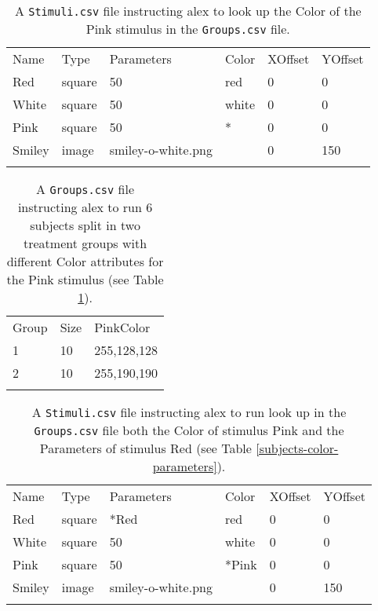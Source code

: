 \documentclass[11pt,]{article}
\renewcommand{\medskip}{}
\begin{document}
\begin{longtable}[c]{@{}llllll@{}}
\hline\noalign{\medskip}
Name & Type & Parameters & Color & XOffset & YOffset
\\\noalign{\medskip}
\hline\noalign{\medskip}
Red & square & 50 & red & 0 & 0
\\\noalign{\medskip}
White & square & 50 & white & 0 & 0
\\\noalign{\medskip}
Pink & square & 50 & * & 0 & 0
\\\noalign{\medskip}
Smiley & image & smiley-o-white.png & & 0 & 150
\\\noalign{\medskip}
\hline
\noalign{\medskip}
\caption{A \texttt{Stimuli.csv} file instructing alex to look up the
Color of the Pink stimulus in the \texttt{Groups.csv} file.
\label{stimuli-color}}
\end{longtable}

\begin{longtable}[c]{@{}lll@{}}
\hline\noalign{\medskip}
Group & Size & PinkColor
\\\noalign{\medskip}
\hline\noalign{\medskip}
1 & 10 & 255,128,128
\\\noalign{\medskip}
2 & 10 & 255,190,190
\\\noalign{\medskip}
\hline
\noalign{\medskip}
\caption{A \texttt{Groups.csv} file instructing alex to run 6 subjects
split in two treatment groups with different Color attributes for the
Pink stimulus (see Table \ref{stimuli-color}). \label{subjects-color}}
\end{longtable}

\begin{longtable}[c]{@{}llllll@{}}
\hline\noalign{\medskip}
Name & Type & Parameters & Color & XOffset & YOffset
\\\noalign{\medskip}
\hline\noalign{\medskip}
Red & square & *Red & red & 0 & 0
\\\noalign{\medskip}
White & square & 50 & white & 0 & 0
\\\noalign{\medskip}
Pink & square & 50 & *Pink & 0 & 0
\\\noalign{\medskip}
Smiley & image & smiley-o-white.png & & 0 & 150
\\\noalign{\medskip}
\hline
\noalign{\medskip}
\caption{A \texttt{Stimuli.csv} file instructing alex to run look up in
the \texttt{Groups.csv} file both the Color of stimulus Pink and the
Parameters of stimulus Red (see Table \ref{subjects-color-parameters}).
\label{stimuli-color-parameters}}
\end{longtable}
\end{document}
